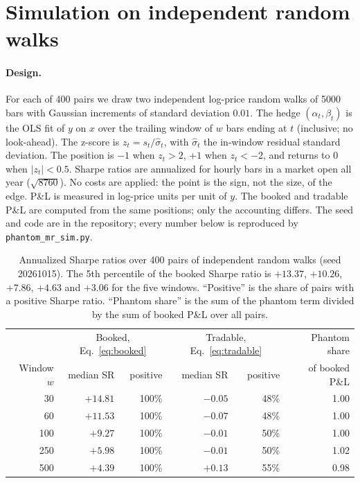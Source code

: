 \documentclass[11pt]{article}
\theoremstyle{remark}
\begin{document}
\section{Simulation on independent random walks}
\label{sec:sim}

\paragraph{Design.} For each of 400 pairs we draw two independent log-price random walks of 5000 bars with
Gaussian increments of standard deviation $0.01$. The hedge $(\alpha_t,\beta_t)$ is the OLS fit of $y$ on $x$
over the trailing window of $w$ bars ending at $t$ (inclusive; no look-ahead). The z-score is
$z_t=s_t/\hat\sigma_t$, with $\hat\sigma_t$ the in-window residual standard deviation. The position is $-1$ when
$z_t>2$, $+1$ when $z_t<-2$, and returns to $0$ when $|z_t|<0.5$. Sharpe ratios are annualized for hourly bars in
a market open all year ($\sqrt{8760}$). No costs are applied: the point is the sign, not the size, of the edge.
P\&L is measured in log-price units per unit of $y$. The booked and tradable P\&L are computed from the same positions; only the accounting differs. The seed and code are in the repository; every number below is reproduced by \texttt{phantom\_mr\_sim.py}.

\begin{table}[htbp]
\centering
\begin{tabular}{rrrrrr}
\toprule
 & \multicolumn{2}{c}{Booked, Eq.~\eqref{eq:booked}} & \multicolumn{2}{c}{Tradable, Eq.~\eqref{eq:tradable}} & Phantom share\\
Window $w$ & median SR & positive & median SR & positive & of booked P\&L\\
\midrule
30  & $+14.81$ & 100\% & $-0.05$ & 48\% & 1.00\\
60  & $+11.53$ & 100\% & $-0.07$ & 48\% & 1.00\\
100 & $+9.27$  & 100\% & $-0.01$ & 50\% & 1.00\\
250 & $+5.98$  & 100\% & $-0.01$ & 50\% & 1.02\\
500 & $+4.39$  & 100\% & $+0.13$ & 55\% & 0.98\\
\bottomrule
\end{tabular}
\caption{Annualized Sharpe ratios over 400 pairs of independent random walks (seed 20261015). The 5th
percentile of the booked Sharpe ratio is $+13.37$, $+10.26$, $+7.86$, $+4.63$ and $+3.06$ for the five windows.
``Positive'' is the share of pairs with a positive Sharpe ratio. ``Phantom share'' is the sum of the phantom term divided by the sum of booked P\&L over all pairs.}
\label{tab:sim}
\end{table}
\end{document}
